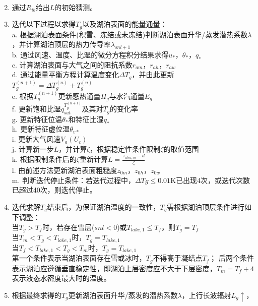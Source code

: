 \begin{enumerate}
\begin{equation}
\begin{array}{cl}
            \end{array}
        \end{equation}
    \item 通过$R_{ib}$给出$L$的初始猜测。
    \item 迭代以下过程以求得$T_g$以及湖泊表面的能量通量：\\
    a. 根据湖泊表面条件(积雪、冻结或未冻结)判断湖泊表面升华/蒸发潜热系数$\lambda$，并计算湖泊顶层的热力传导率$\lambda_{snl+1}$ \\
    b. 通过风速、温度、比湿的微分方程积分结果求得$u_\ast$，$\theta_\ast$，$q_\ast$ \\
    c. 计算湖泊表面与大气之间的阻抗系数$r_{am}$，$r_{ah}$，$r_{aw}$ \\
    d. 通过能量平衡方程计算温度变化$\Delta T_g$，并由此更新$T_g^{\left(n+1\right)}=\Delta T_g^{\left(n\right)}+T_g^{\left(n\right)}$ \\
    e. 根据$T_g^{\left(n+1\right)}$更新感热通量$H_g$与水汽通量$E_g$ \\
    f. 更新饱和比湿$q_{sat}^{T_g^{\left(n+1\right)}}$及其对$T_g$的变化率 \\
    g. 更新特征位温$\theta_\ast$和特征比湿$q_\ast$ \\
    h. 更新特征虚位温$\theta_{v\ast}$ \\
    i. 更新大气风速$V_a\left(U_c\right)$ \\
    j. 计算新一步$L$，并计算$\zeta$，根据稳定性条件限制$\zeta$的取值范围 \\
    k. 根据限制条件后的$\zeta$重新计算$L=\frac{z_{atm,m}-d}{\zeta}$ \\
    l. 由前述方法更新湖泊表面粗糙度$z_{0m}$，$z_{0h}$，$z_{0w}$\\
    m. 判断迭代停止条件：若迭代过程中，$\Delta Tg\leq 0.01$K已出现4次，或迭代次数已超过40次，则迭代停止。
    \item 迭代求解$T_g$结束后，为保证湖泊温度的一致性，$T_g$需根据湖泊顶层条件进行如下调整：\\
    当$T_g>T_f$时，若存在雪层($snl<0$)或$T_{lake,1}\le T_f$，则$T_g=T_f$ \\
    当$T_m<T_g<T_{lake,1}$时，$T_g=T_{lake,1}$ \\
    当$T_f<T_{lake,1}<T_g<T_m$时，$T_g=T_{lake,1}$ \\
    第一个条件表示当湖泊表面存在雪或冰时，$T_g$不得高于凝结点$T_f$；
    后两个条件表示湖泊应遵循垂直稳定性，即湖泊上层密度应不大于下层密度，$T_m=T_f+4$表示液态水密度最大时的温度。
    \item 根据最终求得的$T_g$更新湖泊表面升华/蒸发的潜热系数$\lambda$，上行长波辐射$L_g\uparrow$，

\end{enumerate}
